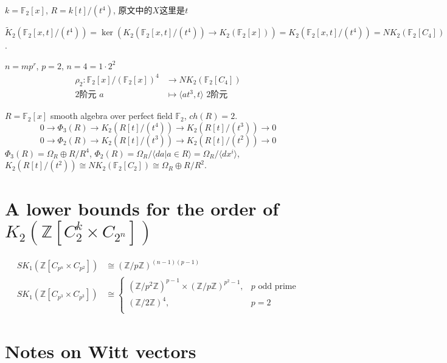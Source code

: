 $k=\mathbb{F}_2[x]$, $R=k[t]/(t^4)$, 原文中的$X$这里是$t$

$\tilde{K}_2(\mathbb{F}_2[x,t]/(t^4))=\ker(K_2(\mathbb{F}_2[x,t]/(t^4))\longrightarrow K_2(\mathbb{F}_2[x]))=K_2(\mathbb{F}_2[x,t]/(t^4))=NK_2(\mathbb{F}_2[C_4])$.

$n=mp^r$, $p=2$, $n=4=1\cdot 2^2$
\begin{align*}
\rho_2 \colon \mathbb{F}_2[x]/(\mathbb{F}_2[x])^4 &\longrightarrow NK_2(\mathbb{F}_2[C_4]) \\
	\text{2阶元 }	a & \mapsto \langle at^3,t \rangle \text{ 2阶元}
\end{align*}

$R=\mathbb{F}_2[x]$ smooth algebra over perfect field $\mathbb{F}_2$, $ch(R)=2$.
\[0\longrightarrow \Phi_3(R) \longrightarrow K_2(R[t]/(t^4))\longrightarrow K_2(R[t]/(t^3))\longrightarrow 0\]
\[0\longrightarrow \Phi_2(R) \longrightarrow K_2(R[t]/(t^3))\longrightarrow K_2(R[t]/(t^2))\longrightarrow 0\]
$\Phi_3(R)=\Omega_R\oplus R/R^4$, $\Phi_2(R)=\Omega_R/\langle da|a\in R\rangle=\Omega_R/\langle dx^i\rangle$, $K_2(R[t]/(t^2))\cong NK_2(\mathbb{F}_2[C_2])\cong \Omega_R \oplus R/R^2$.

\section{A lower bounds for the order of $K_2(\mathbb{Z}[C_2^k\times C_{2^n}])$}
\begin{align*}
SK_1(\mathbb{Z}[C_{p^n}\times C_{p^2}])&\cong (\mathbb{Z}/p\mathbb{Z})^{(n-1)(p-1)}\\
SK_1(\mathbb{Z}[C_{p^3}\times C_{p^3}])&\cong \begin{cases}
	(\mathbb{Z}/p^2\mathbb{Z})^{p-1}\times (\mathbb{Z}/p\mathbb{Z})^{p^2-1} ,& p \text{ odd prime}\\
	(\mathbb{Z}/2\mathbb{Z})^{4},& p=2\\
\end{cases} 
\end{align*}


\section{Notes on Witt vectors}


